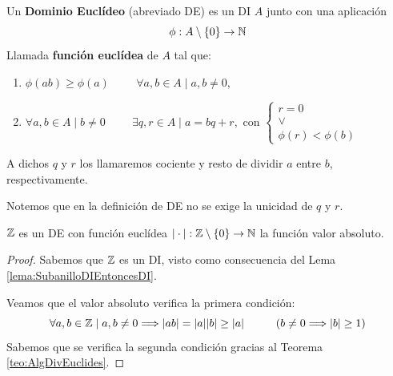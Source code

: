 \begin{definicion}
    Un \textbf{Dominio Euclídeo} (abreviado DE) es un DI $A$ junto con una aplicación
    $$\phi:A\setminus\{0\}\rightarrow\mathbb N$$
    Llamada \textbf{función euclídea} de $A$ tal que:
    \begin{enumerate}
        \item $\phi(ab) \geq \phi(a)\hspace{1cm}\forall a,b \in A \mid a,b \neq 0$,
        \item  $\forall a,b \in A \mid b \neq 0\hspace{1cm}\exists q,r \in A \mid a =bq+r,\text{ con }
        \left\{\begin{array}{c}
            r=0 \\ \lor \\ \phi(r)<\phi(b)
        \end{array}\right.
        $
    \end{enumerate}
\end{definicion}

A dichos $q$ y $r$ los llamaremos cociente y resto de dividir $a$ entre $b$, respectivamente.
\begin{observacion}
    Notemos que en la definición de DE no se exige la unicidad de $q$ y $r$.
\end{observacion}

\begin{prop}
    \label{prop:ZDE}
    $\mathbb Z$ es un DE con función euclídea $|\cdot|:\mathbb Z\setminus\{0\}\rightarrow\mathbb N$ la función valor absoluto.
\end{prop}
\begin{proof}
    Sabemos que $\mathbb Z$ es un DI, visto como consecuencia del Lema \ref{lema:SubanilloDIEntoncesDI}.

    Veamos que el valor absoluto verifica la primera condición:
    $$\forall a,b \in \mathbb Z \mid a,b \neq 0 \Longrightarrow |ab| = |a||b| \geq |a| \hspace{1cm}(b \neq 0 \Longrightarrow |b|\geq1)$$
    Sabemos que se verifica la segunda condición gracias al Teorema \ref{teo:AlgDivEuclides}.
\end{proof}

